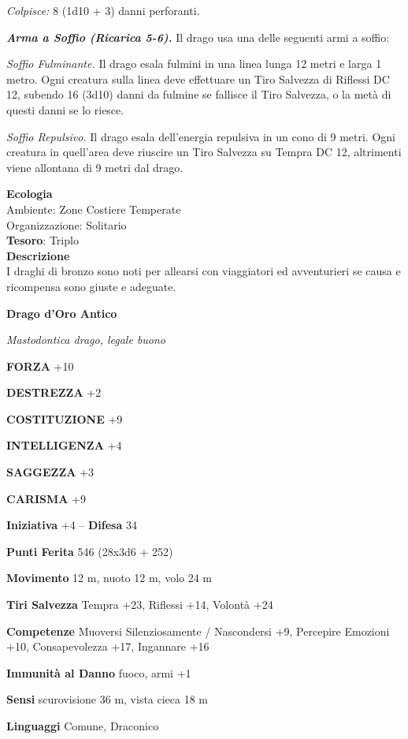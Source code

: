 \begin{multicols}{2}
\textit{Colpisce:} 8 (1d10 + 3) danni perforanti.

\textit{\textbf{Arma a Soffio (Ricarica 5-6).}} Il drago usa una delle seguenti armi a soffio:

\textit{Soffio Fulminante.} Il drago esala fulmini in una linea lunga 12 metri e larga 1 metro. Ogni creatura sulla linea deve effettuare un Tiro Salvezza di Riflessi DC 12, subendo 16 (3d10) danni da fulmine se fallisce il Tiro Salvezza, o la metà di questi danni se lo riesce.

\textit{Soffio Repulsivo.} Il drago esala dell'energia repulsiva in un cono di 9 metri. Ogni creatura in quell'area deve riuscire un Tiro Salvezza su Tempra DC 12, altrimenti viene allontana di 9 metri dal drago.

\textbf{Ecologia}\\
Ambiente: Zone Costiere Temperate\\
Organizzazione: Solitario\\
\textbf{Tesoro}: Triplo\\
\textbf{Descrizione}\\
I draghi di bronzo sono noti per allearsi con viaggiatori ed avventurieri se causa e ricompensa sono giuste e adeguate.

\medskip{}\textbf{Drago d'Oro Antico}

\textit{Mastodontica drago, legale buono}

\textbf{FORZA} +10

\textbf{DESTREZZA} +2

\textbf{COSTITUZIONE} +9

\textbf{INTELLIGENZA} +4

\textbf{SAGGEZZA} +3

\textbf{CARISMA} +9

\textbf{Iniziativa} +4 -- \textbf{Difesa} 34

\textbf{Punti Ferita} 546 (28x3d6 + 252)

\textbf{Movimento} 12 m, nuoto 12 m, volo 24 m

\textbf{Tiri Salvezza} Tempra +23, Riflessi +14, Volontà +24

\textbf{Competenze} Muoversi Silenziosamente / Nascondersi +9, Percepire Emozioni +10, Consapevolezza +17, Ingannare +16

\textbf{Immunità al Danno} fuoco, armi +1

\textbf{Sensi} scurovisione 36 m, vista cieca 18 m

\textbf{Linguaggi} Comune, Draconico


\end{multicols}
